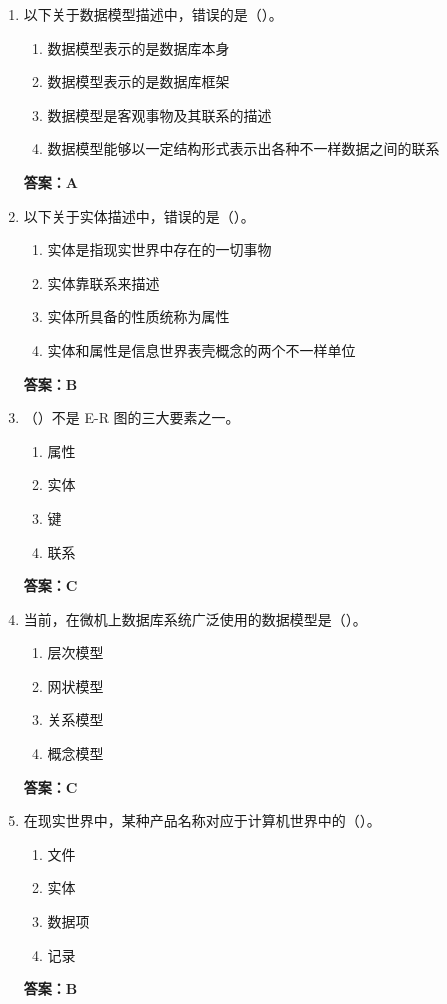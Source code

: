 \documentclass[12pt, a4paper]{article}
\begin{document}
\begin{enumerate}[label=\arabic*.]
	\item 以下关于数据模型描述中，错误的是（\quad）。
	      \begin{enumerate}
		      \item 数据模型表示的是数据库本身
		      \item 数据模型表示的是数据库框架
		      \item 数据模型是客观事物及其联系的描述
		      \item 数据模型能够以一定结构形式表示出各种不一样数据之间的联系
	      \end{enumerate}
	      \textbf{答案：A}

	\item 以下关于实体描述中，错误的是（\quad）。
	      \begin{enumerate}
		      \item 实体是指现实世界中存在的一切事物
		      \item 实体靠联系来描述
		      \item 实体所具备的性质统称为属性
		      \item 实体和属性是信息世界表壳概念的两个不一样单位
	      \end{enumerate}
	      \textbf{答案：B}

	\item （\quad）不是 E-R 图的三大要素之一。
	      \begin{enumerate}
		      \item 属性
		      \item 实体
		      \item 键
		      \item 联系
	      \end{enumerate}
	      \textbf{答案：C}

	\item 当前，在微机上数据库系统广泛使用的数据模型是（\quad）。
	      \begin{enumerate}
		      \item 层次模型
		      \item 网状模型
		      \item 关系模型
		      \item 概念模型
	      \end{enumerate}
	      \textbf{答案：C}

	\item 在现实世界中，某种产品名称对应于计算机世界中的（\quad）。
	      \begin{enumerate}
		      \item 文件
		      \item 实体
		      \item 数据项
		      \item 记录
	      \end{enumerate}
	      \textbf{答案：B}


\end{enumerate}
\end{document}
